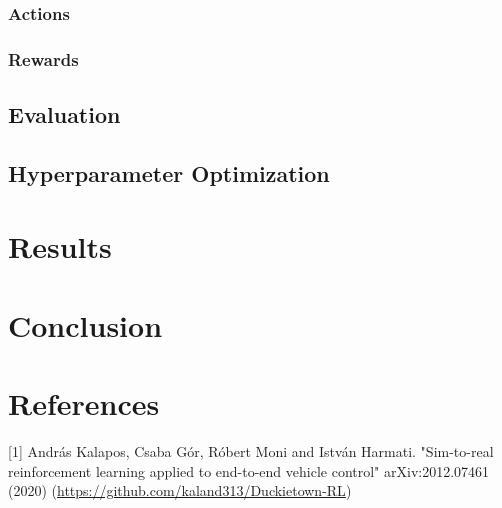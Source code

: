 \documentclass{article}
\begin{document}
\subsubsection{\normalsize{Actions}}

\subsubsection{\normalsize{Rewards}}

\subsection{\normalsize{Evaluation}}

\subsection{\normalsize{Hyperparameter Optimization}}

\section{\large{Results}}

\section{\large{Conclusion}}

\section*{References}

\small

[1] András Kalapos, Csaba Gór, Róbert Moni and István Harmati. "Sim-to-real reinforcement learning applied to end-to-end vehicle control" arXiv:2012.07461
(2020) (\url{https://github.com/kaland313/Duckietown-RL})
\end{document}
